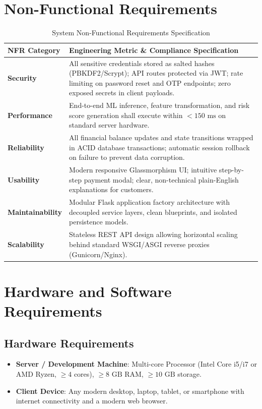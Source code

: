 \section{Non-Functional Requirements}
\begin{table}[h]
\centering
\caption{System Non-Functional Requirements Specification}
\label{tab:non_functional_requirements}
\begin{tabularx}{\textwidth}{lX}
\toprule
\textbf{NFR Category} & \textbf{Engineering Metric \& Compliance Specification} \\
\midrule
\textbf{Security} & All sensitive credentials stored as salted hashes (PBKDF2/Scrypt); API routes protected via JWT; rate limiting on password reset and OTP endpoints; zero exposed secrets in client payloads. \\
\addlinespace
\textbf{Performance} & End-to-end ML inference, feature transformation, and risk score generation shall execute within $< 150\text{ ms}$ on standard server hardware. \\
\addlinespace
\textbf{Reliability} & All financial balance updates and state transitions wrapped in ACID database transactions; automatic session rollback on failure to prevent data corruption. \\
\addlinespace
\textbf{Usability} & Modern responsive Glassmorphism UI; intuitive step-by-step payment modal; clear, non-technical plain-English explanations for customers. \\
\addlinespace
\textbf{Maintainability} & Modular Flask application factory architecture with decoupled service layers, clean blueprints, and isolated persistence models. \\
\addlinespace
\textbf{Scalability} & Stateless REST API design allowing horizontal scaling behind standard WSGI/ASGI reverse proxies (Gunicorn/Nginx). \\
\bottomrule
\end{tabularx}
\end{table}

\section{Hardware and Software Requirements}
\subsection{Hardware Requirements}
\begin{itemize}
    \item \textbf{Server / Development Machine}: Multi-core Processor (Intel Core i5/i7 or AMD Ryzen, $\ge 4$ cores), $\ge 8\text{ GB}$ RAM, $\ge 10\text{ GB}$ storage.
    \item \textbf{Client Device}: Any modern desktop, laptop, tablet, or smartphone with internet connectivity and a modern web browser.
\end{itemize}

